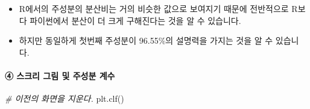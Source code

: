 \documentclass[
]{article}
\newenvironment{Shaded}{\begin{snugshade}}{\end{snugshade}}
\newcommand{\CommentTok}[1]{\textcolor[rgb]{0.56,0.35,0.01}{\textit{#1}}}
\newcommand{\NormalTok}[1]{#1}
\providecommand{\tightlist}{%
  \setlength{\itemsep}{0pt}\setlength{\parskip}{0pt}}
\begin{document}
\begin{itemize}
\tightlist
\item
  R에서의 주성분의 분산비는 거의 비슷한 값으로 보여지기 때문에
  전반적으로 R보다 파이썬에서 분산이 더 크게 구해진다는 것을 알 수
  있습니다.
\item
  하지만 동일하게 첫번째 주성분이 96.55\%의 설명력을 가지는 것을 알 수
  있습니다.
\end{itemize}

\hypertarget{uxc2a4uxd06cuxb9ac-uxadf8uxb9bc-uxbc0f-uxc8fcuxc131uxbd84-uxacc4uxc218-1}{%
\paragraph{④ 스크리 그림 및 주성분
계수}\label{uxc2a4uxd06cuxb9ac-uxadf8uxb9bc-uxbc0f-uxc8fcuxc131uxbd84-uxacc4uxc218-1}}

\begin{Shaded}
\begin{Highlighting}[]
\CommentTok{\# 이전의 화면을 지운다.}
\NormalTok{plt.clf()}
\end{Highlighting}
\end{Shaded}
\end{document}
